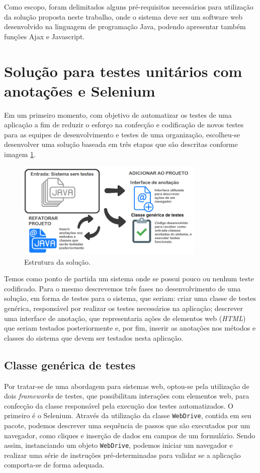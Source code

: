 \documentclass[tg]{mdtufsm}
\begin{document}
Como escopo, foram delimitados alguns pré-requisitos necessários para utilização da solução proposta neste trabalho, onde o sistema deve ser um software web desenvolvido na linguagem de programação Java,
podendo apresentar também funções Ajax e Javascript.

\section{Solução para testes unitários com anotações e Selenium}
Em um primeiro momento, com objetivo de automatizar os testes de uma aplicação a fim de reduzir o esforço na confecção e codificação de novos testes para as equipes de desenvolvimento e testes de uma organização,
escolheu-se desenvolver uma solução baseada em três etapas que são descritas conforme imagem \ref{fig:solucao1}.

\begin{figure}[!htb]
	\centering
	\includegraphics[width=0.8\textwidth]{solucao1}
	\caption{Estrutura da solução.}
	\label{fig:solucao1}
\end{figure}

Temos como ponto de partida um sistema onde se possui pouco ou nenhum teste codificado. Para o mesmo descrevemos  três fases no desenvolvimento de uma solução, em forma de testes para o sistema,
que seriam: criar uma classe de testes genérica, responsável por realizar os testes necessários na aplicação; descrever uma interface de anotação, que representaria ações de elementos web (\emph{HTML}) que
seriam testados posteriormente e, por fim, inserir as anotações nos métodos e classes do sistema que devem ser testados nesta aplicação.

\subsection{Classe genérica de testes}
Por tratar-se de uma abordagem para sistemas web, optou-se pela utilização de dois \emph{frameworks} de testes, que possibilitam interações com elementos web, para confecção da classe responsável pela execução dos testes automatizados.
O primeiro é o Selenium. Através da utilização da classe \texttt{WebDrive}, contida em seu pacote, podemos descrever uma sequência de passos que são executados por um navegador, como cliques e inserção de dados em campos de um
formulário. Sendo assim, instanciando um objeto \texttt{WebDrive}, podemos iniciar um navegador e realizar uma série de instruções pré-determinadas para validar se a aplicação comporta-se de forma adequada.
\end{document}
